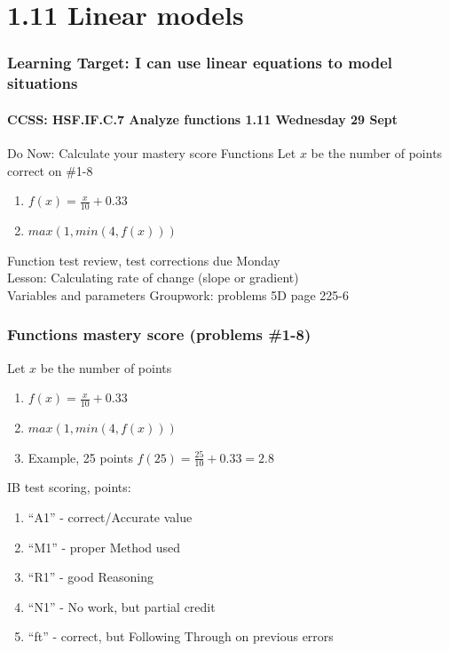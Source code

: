 \documentclass{beamer}
\begin{document}
  \section{1.11 Linear models}
  \frame
  {
    \frametitle{Learning Target: I can use linear equations to model situations}
    \framesubtitle{CCSS: HSF.IF.C.7 Analyze functions \hfill \alert{1.11 Wednesday 29 Sept}}

    \begin{block}{Do Now: Calculate your mastery score Functions}
        Let $x$ be the number of points correct on \#1-8
        \begin{enumerate}
          \item $\displaystyle f(x)=\frac{x}{10} + 0.33$
          \item $max(1,min(4,f(x)))$
        \end{enumerate}
    \end{block}\vspace{0.5cm}
    Function test review, test corrections due Monday\\[0.5cm]
    Lesson: Calculating rate of change (slope or gradient)\\[0.25cm]
    Variables and parameters
    Groupwork: problems 5D page 225-6
  }

  \frame
  {
    \frametitle{Functions mastery score (problems  \#1-8)}

    \begin{block}{Let $x$ be the number of points}
      
      \begin{enumerate}
        \item $\displaystyle f(x)=\frac{x}{10} + 0.33$
        \item $max(1,min(4,f(x)))$
        \item Example, 25 points $\displaystyle f(25)=\frac{25}{10} + 0.33=2.8$
      \end{enumerate}
    \end{block}
    IB test scoring, points:
    \begin{enumerate}
      \item ``A1'' - correct/Accurate value
      \item ``M1'' - proper Method used
      \item  ``R1'' - good Reasoning
      \item  ``N1'' - No work, but partial credit
      \item  ``ft'' - correct, but Following Through on previous errors
    \end{enumerate}
  }
\end{document}
